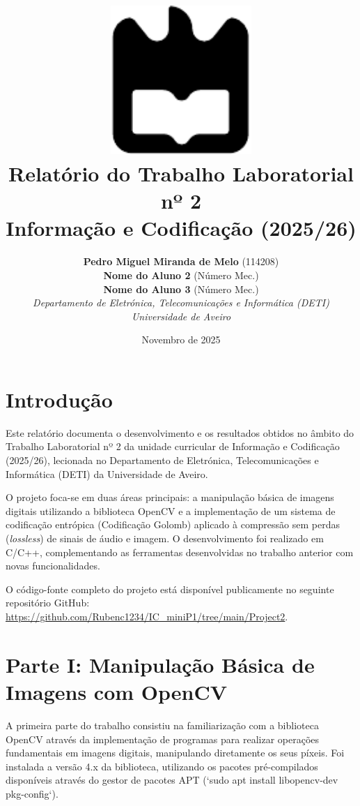 \documentclass[a4paper, 11pt, portuguese]{article}
\title{
    \includegraphics[width=0.4\textwidth]{imagens/ua.pdf} \\ \vspace{1.5cm}
    \textbf{Relatório do Trabalho Laboratorial nº 2} \\
    \large Informação e Codificação (2025/26)
}
\author{
    \textbf{Pedro Miguel Miranda de Melo} (114208) \\
    \textbf{Nome do Aluno 2} (Número Mec.) \\
    \textbf{Nome do Aluno 3} (Número Mec.) \\
    \textit{Departamento de Eletrónica, Telecomunicações e Informática (DETI)} \\
    \textit{Universidade de Aveiro}
}
\date{Novembro de 2025}
\begin{document}
\maketitle
\thispagestyle{empty} %

\newpage
\tableofcontents %
\newpage

\section{Introdução}

Este relatório documenta o desenvolvimento e os resultados obtidos no âmbito do Trabalho Laboratorial nº 2 da unidade curricular de Informação e Codificação (2025/26), lecionada no Departamento de Eletrónica, Telecomunicações e Informática (DETI) da Universidade de Aveiro.

O projeto foca-se em duas áreas principais: a manipulação básica de imagens digitais utilizando a biblioteca OpenCV e a implementação de um sistema de codificação entrópica (Codificação Golomb) aplicado à compressão sem perdas (\textit{lossless}) de sinais de áudio e imagem. O desenvolvimento foi realizado em C/C++, complementando as ferramentas desenvolvidas no trabalho anterior com novas funcionalidades.

O código-fonte completo do projeto está disponível publicamente no seguinte repositório GitHub: \url{https://github.com/Rubenc1234/IC_miniP1/tree/main/Project2}.

\section{Parte I: Manipulação Básica de Imagens com OpenCV}

A primeira parte do trabalho consistiu na familiarização com a biblioteca OpenCV através da implementação de programas para realizar operações fundamentais em imagens digitais, manipulando diretamente os seus píxeis. Foi instalada a versão 4.x da biblioteca, utilizando os pacotes pré-compilados disponíveis através do gestor de pacotes APT (`sudo apt install libopencv-dev pkg-config`).
\end{document}
